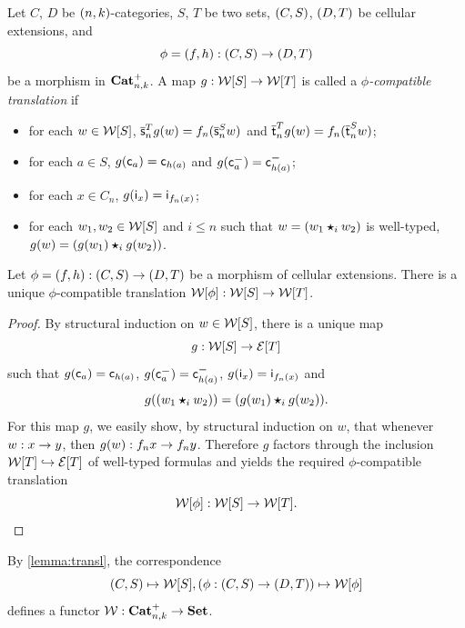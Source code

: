  \begin{paragr}\label{paragr:transl}
  Let $C$, $D$ be $(n,k)$-categories, $S$, $T$ be two sets,  $(C,S)$, $(D,T)$ be cellular extensions, and
  \[\phi=(f,h): (C,S)\to(D,T) \]
  be a morphism in $\mathbf{Cat}_{n,k}^{+}$. A map $g:\mathcal{W}[S]\to\mathcal{W}[T]$ is called a {\em
   $\phi$-compatible translation} if
  \begin{itemize}
  \item for each $w\in\mathcal{W}[S]$, $\overline{\mathsf{s}}_{n}^Tg(w)=f_n(\overline{\mathsf{s}}_{n}^S w)$ and
    $\overline{\mathsf{t}}_{n}^T g(w)=f_n(\overline{\mathsf{t}}_{n}^S w)$;
    \item for each $a\in S$, $g(\mathsf{c}_{a})=\mathsf{c}_{h(a)}$ and $g(\mathsf{c}^{\boldsymbol{-}}_{a})=\mathsf{c}^{\boldsymbol{-}}_{h(a)}$;
    \item for each $x\in C_n$,  $g(\mathsf{i}_{x})=\mathsf{i}_{f_n(x)}$;
    \item  for each $w_1,w_2\in\mathcal{W}[S]$ and $i\leq n$ such that
      $w=(w_1\bm{\star}_{i} w_2)$ is well-typed, $g(w)=(g(w_1)\bm{\star}_{i} g(w_2))$.  
    \end{itemize}
\end{paragr}
\begin{lemma}\label{lemma:transl}
  Let $\phi=(f,h):(C,S)\to (D,T)$ be a morphism of cellular
  extensions. There is a unique $\phi$-compatible translation $\mathcal{W}[\phi]:\mathcal{W}[S]\to \mathcal{W}[T]$.
\end{lemma}
\begin{proof}
  By structural induction on $w\in\mathcal{W}[S]$, there is a unique map
  \[g:\mathcal{W}[S]\to \mathcal{E}[T]\]
  such that $g(\mathsf{c}_{a})=\mathsf{c}_{h(a)}$, $g(\mathsf{c}^{\boldsymbol{-}}_{a})=\mathsf{c}^{\boldsymbol{-}}_{h(a)}$, $g(\mathsf{i}_{x})=\mathsf{i}_{f_n(x)}$ and \[g((w_1\bm{\star}_{i}
      w_2))=(g(w_1)\bm{\star}_{i} g(w_2)).\] For this map $g$, we easily
      show, by structural induction on $w$, that
      whenever $w:x\to y$, then $g(w):f_nx\to f_n y$. Therefore
      $g$ factors through the inclusion $\mathcal{W}[T]\hookrightarrow \mathcal{E}[T]$ of
      well-typed formulas and yields the required $\phi$-compatible
      translation \[\mathcal{W}[\phi]:\mathcal{W}[S]\to \mathcal{W}[T].\qedhere\] 
    \end{proof}
    \begin{remark}\label{rmk:functoriality_of_wtx}
      By \cref{lemma:transl}, the correspondence
      \[
        (C,S)\mapsto \mathcal{W}[S], (\phi:(C,S)\to (D,T))\mapsto \mathcal{W}[\phi]
        \]
     defines a functor 
      $\mathcal{W}:\mathbf{Cat}_{n,k}^{+}\to\mathbf{Set}$.
    \end{remark}

